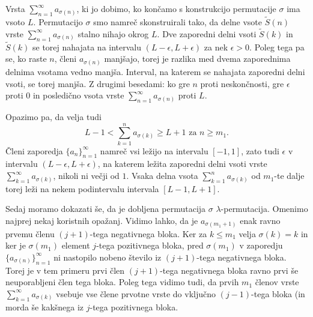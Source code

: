 \documentclass[12pt,a4paper,reqno]{amsart}
\theoremstyle{definition} %
\theoremstyle{plain} %
\begin{document}
Vrsta $\sum^{\infty}_{n=1}a_{\sigma(n)}$, ki jo dobimo, ko končamo s konstrukcijo permutacije $\sigma$ ima vsoto $L$. Permutacijo $\sigma$ smo namreč skonstruirali tako, da delne vsote $\tilde{S}(n)$ vrste $\sum^{\infty}_{n=1}a_{\sigma(n)}$ stalno nihajo okrog $L$. Dve zaporedni delni vsoti $\tilde{S}(k)$ in $\tilde{S}(k)$ se torej nahajata na intervalu $(L-\epsilon, L+\epsilon)$ za nek $\epsilon > 0$. Poleg tega pa se, ko raste $n$, členi $a_{\sigma(n)}$ manjšajo, torej je razlika med dvema zaporednima delnima vsotama vedno manjša. Interval, na katerem se nahajata zaporedni delni vsoti, se torej manjša. Z drugimi besedami: ko gre $n$ proti neskončnosti, gre $\epsilon$ proti $0$ in posledično vsota vrste $\sum^{\infty}_{n=1}a_{\sigma(n)}$ proti $L$.

Opazimo pa, da velja tudi $$L-1<\sum_{k=1}^{n}a_{\sigma(k)} \geq L+1\textrm{ za }n\geq m_1.$$ Členi zaporedja $\{a_n\}_{n=1}^{\infty}$ namreč vsi ležijo na intervalu $[-1,1]$, zato tudi $\epsilon$ v intervalu $(L-\epsilon, L+\epsilon)$, na katerem ležita zaporedni delni vsoti vrste $\sum_{k=1}^{\infty}a_{\sigma(k)}$, nikoli ni večji od $1$. Vsaka delna vsota $\sum_{k=1}^{n}a_{\sigma(k)}$ od $m_1$-te dalje torej leži na nekem podintervalu intervala $[L-1,L+1]$. %

Sedaj moramo dokazati še, da je dobljena permutacija $\sigma$ $\lambda$-permutacija. Omenimo najprej nekaj koristnih opažanj. Vidimo lahko, da je $a_{\sigma(m_1+1)}$ enak ravno prvemu členu $(j+1)$-tega negativnega bloka. Ker za $k \leq m_1$ velja $\sigma(k)=k$ in ker je $\sigma(m_1)$ element $j$-tega pozitivnega bloka, pred $\sigma(m_1)$ v zaporedju $\{a_{\sigma(n)}\}_{n=1}^{\infty}$ ni nastopilo nobeno število iz $(j+1)$-tega negativnega bloka. Torej je v tem primeru prvi člen $(j+1)$-tega negativnega bloka ravno prvi še neuporabljeni člen tega bloka. Poleg tega vidimo tudi, da prvih $m_1$ členov vrste $\sum_{k=1}^{\infty}a_{\sigma(k)}$ vsebuje vse člene prvotne vrste do vključno $(j-1)$-tega bloka (in morda še kakšnega iz $j$-tega pozitivnega bloka.
\end{document}

